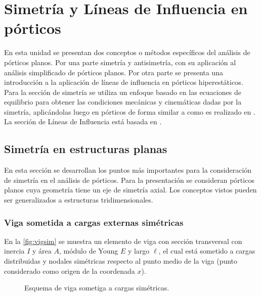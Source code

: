 

\chapter[Simetría y Líneas de Influencia en pórticos]{Simetría y Líneas de Influencia en pórticos}


En esta unidad se presentan dos conceptos o métodos específicos del análisis de pórticos planos.  Por una parte simetría y antisimetría, con su aplicación al análisis simplificado de pórticos planos. Por otra parte se presenta una introducción a la aplicación de líneas de influencia en pórticos hiperestáticos. %
%
Para la sección de simetría se utiliza un enfoque basado en las ecuaciones de equilibrio para obtener las condiciones mecánicas y cinemáticas dadas por la simetría, aplicándolas luego en pórticos de forma similar a como es realizado en \citep{CerveraRuiz2002ii}. %
%
La sección de Líneas de Influencia está basada en \citep{Celigueta2003}.




\section{Simetría en estructuras planas}

En esta sección se desarrollan los puntos más importantes para la consideración de simetría en el análisis de pórticos. %
%
Para la presentación se consideran pórticos planos cuya geometría tiene un eje de simetría axial. %
%
Los conceptos vistos pueden ser generalizados a estructuras tridimensionales.

\subsection{Viga sometida a cargas externas simétricas}

En la \autoref{fig:vigsim} se muestra un elemento de viga con sección transversal con inercia $I$ y área $A$, módulo de Young $E$ y largo $\ell$, el cual está sometido a cargas distribuidas y nodales simétricas respecto al punto medio de la viga (punto considerado como origen de la coordenada $x$). %

\begin{figure}[htb]
\centering
\def\svgwidth{0.9\textwidth}

\caption{Esquema de viga sometiga a cargas simétricas.}
\label{fig:vigsim}
\end{figure}

